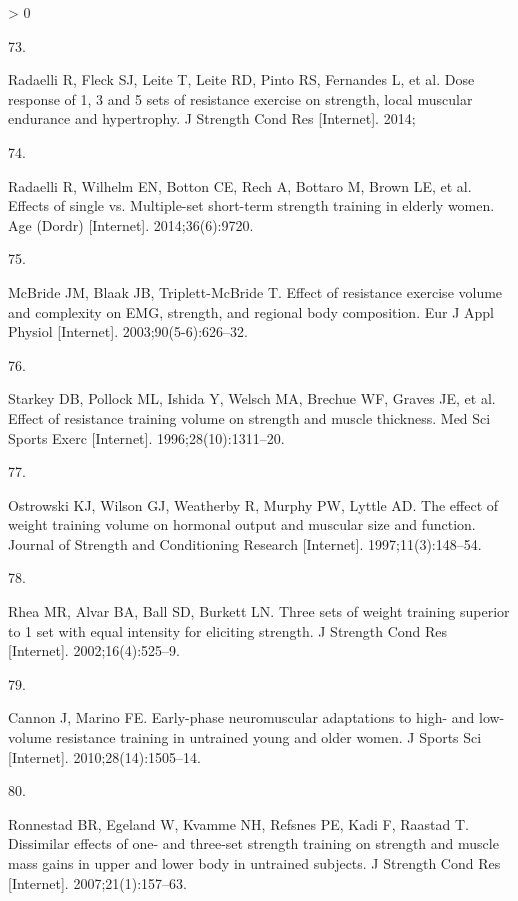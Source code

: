 \documentclass[twoside,10pt]{gihclass} %
\newlength{\cslhangindent}
\newlength{\csllabelwidth}
\newenvironment{CSLReferences}[3] %
 {%
  \setlength{\parindent}{0pt}
  \ifodd #1 \everypar{\setlength{\hangindent}{\cslhangindent}}\ignorespaces\fi
  \ifnum #2 > 0
  \setlength{\parskip}{#2\baselineskip}
  \fi
 }%
 {}
\newcommand{\CSLLeftMargin}[1]{\parbox[t]{\maxof{\widthof{#1}}{\csllabelwidth}}{#1}}
\newcommand{\CSLRightInline}[1]{\parbox[t]{\linewidth}{#1}}
\begin{document}
\begin{CSLReferences}{0}{0}
\leavevmode\hypertarget{ref-RN1570}{}%
\CSLLeftMargin{73. }
\CSLRightInline{Radaelli R, Fleck SJ, Leite T, Leite RD, Pinto RS, Fernandes L, et al. Dose response of 1, 3 and 5 sets of resistance exercise on strength, local muscular endurance and hypertrophy. J Strength Cond Res {[}Internet{]}. 2014; }

\leavevmode\hypertarget{ref-RN1518}{}%
\CSLLeftMargin{74. }
\CSLRightInline{Radaelli R, Wilhelm EN, Botton CE, Rech A, Bottaro M, Brown LE, et al. Effects of single vs. Multiple-set short-term strength training in elderly women. Age (Dordr) {[}Internet{]}. 2014;36(6):9720. }

\leavevmode\hypertarget{ref-RN1474}{}%
\CSLLeftMargin{75. }
\CSLRightInline{McBride JM, Blaak JB, Triplett-McBride T. Effect of resistance exercise volume and complexity on EMG, strength, and regional body composition. Eur J Appl Physiol {[}Internet{]}. 2003;90(5-6):626--32. }

\leavevmode\hypertarget{ref-RN1456}{}%
\CSLLeftMargin{76. }
\CSLRightInline{Starkey DB, Pollock ML, Ishida Y, Welsch MA, Brechue WF, Graves JE, et al. Effect of resistance training volume on strength and muscle thickness. Med Sci Sports Exerc {[}Internet{]}. 1996;28(10):1311--20. }

\leavevmode\hypertarget{ref-RN1454}{}%
\CSLLeftMargin{77. }
\CSLRightInline{Ostrowski KJ, Wilson GJ, Weatherby R, Murphy PW, Lyttle AD. The effect of weight training volume on hormonal output and muscular size and function. Journal of Strength and Conditioning Research {[}Internet{]}. 1997;11(3):148--54. }

\leavevmode\hypertarget{ref-RN1384}{}%
\CSLLeftMargin{78. }
\CSLRightInline{Rhea MR, Alvar BA, Ball SD, Burkett LN. Three sets of weight training superior to 1 set with equal intensity for eliciting strength. J Strength Cond Res {[}Internet{]}. 2002;16(4):525--9. }

\leavevmode\hypertarget{ref-RN1382}{}%
\CSLLeftMargin{79. }
\CSLRightInline{Cannon J, Marino FE. Early-phase neuromuscular adaptations to high- and low-volume resistance training in untrained young and older women. J Sports Sci {[}Internet{]}. 2010;28(14):1505--14. }

\leavevmode\hypertarget{ref-RN776}{}%
\CSLLeftMargin{80. }
\CSLRightInline{Ronnestad BR, Egeland W, Kvamme NH, Refsnes PE, Kadi F, Raastad T. Dissimilar effects of one- and three-set strength training on strength and muscle mass gains in upper and lower body in untrained subjects. J Strength Cond Res {[}Internet{]}. 2007;21(1):157--63. }


\end{CSLReferences}
\end{document}
